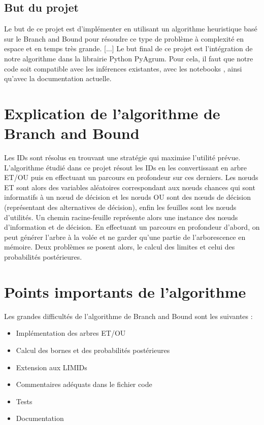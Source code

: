 \documentclass[12pt]{article}
\begin{document}
\subsection{But du projet}
Le but de ce projet est d'implémenter en utilisant un algorithme heuristique basé sur le Branch and Bound pour résoudre ce type de problème à complexité en espace et en temps très grande. %
[...]
Le but final de ce projet est l'intégration de notre algorithme dans la librairie Python PyAgrum. Pour cela, il faut que notre code soit compatible avec les inférences existantes, avec les notebooks , ainsi qu'avec la documentation actuelle.

\section{Explication de l'algorithme de Branch and Bound}
Les IDs sont résolus en trouvant une stratégie qui maximise l'utilité prévue.
L'algorithme étudié dans ce projet résout les IDs en les convertissant en arbre ET/OU puis en effectuant un parcours en profondeur sur ces derniers.
Les nœuds ET sont alors des variables aléatoires correspondant aux nœuds chances qui sont informatifs à un nœud de décision et les nœuds OU sont des nœuds de décision (représentant des alternatives de décision), enfin les feuilles sont les nœuds d'utilités.
Un chemin racine-feuille représente alors une instance des nœuds d'information et de décision.
En effectuant un parcours en profondeur d'abord, on peut générer l'arbre à la volée et ne garder qu'une partie de l'arborescence en mémoire.
Deux problèmes se posent alors, le calcul des limites et celui des probabilités postérieures.

\section{Points importants de l'algorithme}
Les grandes difficultés de l'algorithme de Branch and Bound sont les suivantes :
\begin{itemize}
\item Implémentation des arbres ET/OU
\item Calcul des bornes et des probabilités postérieures
\item Extension aux LIMIDs
\item Commentaires adéquats dans le fichier code
\item Tests
\item Documentation
\end{itemize}
\end{document}
